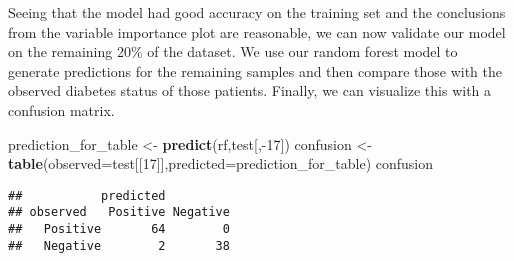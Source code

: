 \documentclass[
]{article}
\newenvironment{Shaded}{}{}
\newcommand{\DataTypeTok}[1]{\textcolor[rgb]{0.56,0.13,0.00}{#1}}
\newcommand{\DecValTok}[1]{\textcolor[rgb]{0.25,0.63,0.44}{#1}}
\newcommand{\KeywordTok}[1]{\textcolor[rgb]{0.00,0.44,0.13}{\textbf{#1}}}
\newcommand{\NormalTok}[1]{#1}
\newcommand{\OperatorTok}[1]{\textcolor[rgb]{0.40,0.40,0.40}{#1}}
\newcommand{\StringTok}[1]{\textcolor[rgb]{0.25,0.44,0.63}{#1}}
\begin{document}
Seeing that the model had good accuracy on the training set and the
conclusions from the variable importance plot are reasonable, we can now
validate our model on the remaining 20\% of the dataset. We use our
random forest model to generate predictions for the remaining samples
and then compare those with the observed diabetes status of those
patients. Finally, we can visualize this with a confusion matrix.

\begin{Shaded}
\begin{Highlighting}[]
\NormalTok{prediction_for_table <-}\StringTok{ }\KeywordTok{predict}\NormalTok{(rf,test[,}\OperatorTok{-}\DecValTok{17}\NormalTok{])}
\NormalTok{confusion <-}\StringTok{ }\KeywordTok{table}\NormalTok{(}\DataTypeTok{observed=}\NormalTok{test[[}\DecValTok{17}\NormalTok{]],}\DataTypeTok{predicted=}\NormalTok{prediction_for_table)}
\NormalTok{confusion}
\end{Highlighting}
\end{Shaded}

\begin{verbatim}
##           predicted
## observed   Positive Negative
##   Positive       64        0
##   Negative        2       38
\end{verbatim}
\end{document}
